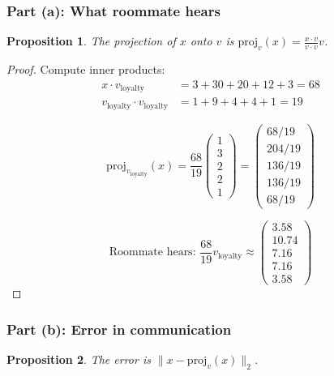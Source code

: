 \documentclass[12pt]{article}
\newtheorem{proposition}{Proposition}
\theoremstyle{definition}
\begin{document}
\subsubsection*{Part (a): What roommate hears}

\begin{proposition}
The projection of $x$ onto $v$ is $\text{proj}_v(x) = \frac{x \cdot v}{v \cdot v} v$.
\end{proposition}

\begin{proof}
Compute inner products:
\begin{align*}
x \cdot v_{\text{loyalty}} &= 3 + 30 + 20 + 12 + 3 = 68 \\
v_{\text{loyalty}} \cdot v_{\text{loyalty}} &= 1 + 9 + 4 + 4 + 1 = 19
\end{align*}

\[
\text{proj}_{v_{\text{loyalty}}}(x) = \frac{68}{19} \begin{pmatrix} 1 \\ 3 \\ 2 \\ 2 \\ 1 \end{pmatrix} = \begin{pmatrix} 68/19 \\ 204/19 \\ 136/19 \\ 136/19 \\ 68/19 \end{pmatrix}
\]

\[
\boxed{\text{Roommate hears: } \frac{68}{19}v_{\text{loyalty}} \approx \begin{pmatrix} 3.58 \\ 10.74 \\ 7.16 \\ 7.16 \\ 3.58 \end{pmatrix}}
\]
\end{proof}

\subsubsection*{Part (b): Error in communication}

\begin{proposition}
The error is $\|x - \text{proj}_v(x)\|_2$.
\end{proposition}
\end{document}
